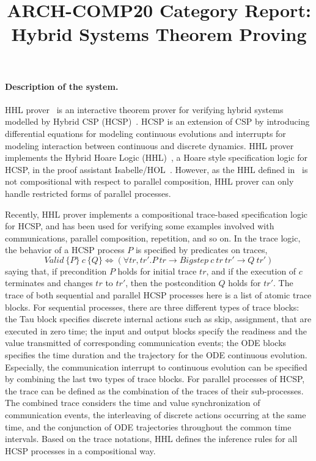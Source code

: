 \documentclass[runningheads,a4paper]{llncs}
\begin{document}
\author{}
\institute{}

\title{ARCH-COMP20 Category Report: Hybrid Systems Theorem Proving}

\maketitle

\paragraph{Description of the system.}

HHL prover~\cite{WZZ15} is an interactive theorem prover for verifying
hybrid systems modelled by Hybrid CSP (HCSP)~\cite{He94,ZWR96}. HCSP is an extension of CSP by introducing differential equations for modeling continuous evolutions and interrupts for modeling interaction between continuous and discrete dynamics.  HHL prover
implements the Hybrid Hoare Logic (HHL)~\cite{LLQZ10}, a Hoare style specification
logic for HCSP, in the proof assistant
Isabelle/HOL~\cite{isabelle}. However,  as the HHL defined in~\cite{LLQZ10} is not compositional with respect to 
parallel composition, HHL prover can only handle restricted forms of parallel processes. 

Recently, HHL prover implements a compositional trace-based specification logic for HCSP, and has
been used for verifying some examples involved with communications, parallel composition, repetition, and so on. 
In the trace logic, the behavior of a HCSP process $P$ is specified by predicates on traces,
\[Valid\  \{P\}~ c ~\{Q\} \Leftrightarrow (\forall tr, tr'. P\ tr \rightarrow Bigstep \ c \ tr\ tr' \rightarrow Q\ tr') \]
saying that, if precondition $P$ holds for initial trace $tr$, and if the execution of $c$ terminates and  changes $tr$ to $tr'$, then the postcondition $Q$ holds for $tr'$. The trace of both sequential and parallel HCSP processes here is a list of atomic trace blocks. For sequential processes, there are three different types of trace blocks: the Tau block specifies discrete internal actions such as skip, assignment, that are executed in zero time; the input and output blocks specify the readiness and the value transmitted of corresponding communication events; the ODE blocks specifies the time duration and the trajectory for the ODE continuous evolution. Especially, the communication interrupt to continuous evolution can be specified by combining the last two types of trace blocks.   
 For parallel processes of HCSP, the trace can be defined as the combination  of the traces of their sub-processes. The combined trace considers the time and value synchronization of communication events, the interleaving of discrete actions occurring at the same time, and the conjunction of ODE trajectories throughout the common time intervals. Based on the trace notations, HHL defines the inference rules for all HCSP processes in a compositional way.
 
\end{document}
